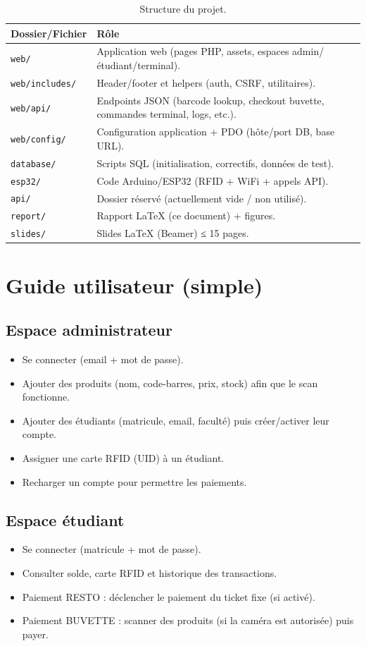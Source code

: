 \documentclass[12pt,a4paper]{report}
\begin{document}
\begin{table}[H]
\centering
\begin{tabular}{p{} p{}}
\toprule
\textbf{Dossier/Fichier} & \textbf{Rôle}\\
\midrule
\texttt{web/} & Application web (pages PHP, assets, espaces admin/étudiant/terminal).\\
\texttt{web/includes/} & Header/footer et helpers (auth, CSRF, utilitaires).\\
\texttt{web/api/} & Endpoints JSON (barcode lookup, checkout buvette, commandes terminal, logs, etc.).\\
\texttt{web/config/} & Configuration application + PDO (hôte/port DB, base URL).\\
\texttt{database/} & Scripts SQL (initialisation, correctifs, données de test).\\
\texttt{esp32/} & Code Arduino/ESP32 (RFID + WiFi + appels API).\\
\texttt{api/} & Dossier réservé (actuellement vide / non utilisé).\\
\texttt{report/} & Rapport LaTeX (ce document) + figures.\\
\texttt{slides/} & Slides LaTeX (Beamer) ≤ 15 pages.\\
\bottomrule
\end{tabular}
\caption{Structure du projet.}
\end{table}

\section{Guide utilisateur (simple)}
\subsection{Espace administrateur}
\begin{itemize}
  \item Se connecter (email + mot de passe).
  \item Ajouter des produits (nom, code-barres, prix, stock) afin que le scan fonctionne.
  \item Ajouter des étudiants (matricule, email, faculté) puis créer/activer leur compte.
  \item Assigner une carte RFID (UID) à un étudiant.
  \item Recharger un compte pour permettre les paiements.
\end{itemize}

\subsection{Espace étudiant}
\begin{itemize}
  \item Se connecter (matricule + mot de passe).
  \item Consulter solde, carte RFID et historique des transactions.
  \item Paiement RESTO : déclencher le paiement du ticket fixe (si activé).
  \item Paiement BUVETTE : scanner des produits (si la caméra est autorisée) puis payer.
\end{itemize}
\end{document}
